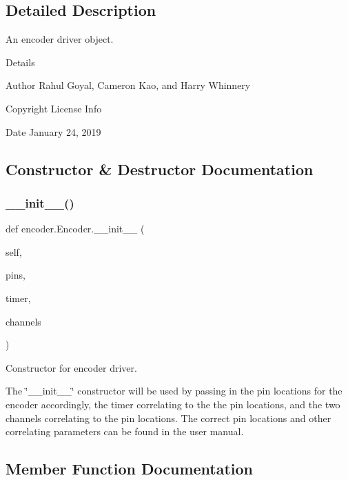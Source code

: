 \subsection{Detailed Description}
An encoder driver object. 

Details \begin{DoxyAuthor}{Author}
Rahul Goyal, Cameron Kao, and Harry Whinnery 
\end{DoxyAuthor}
\begin{DoxyCopyright}{Copyright}
License Info 
\end{DoxyCopyright}
\begin{DoxyDate}{Date}
January 24, 2019 
\end{DoxyDate}


\subsection{Constructor \& Destructor Documentation}
\mbox{\label{classencoder_1_1_encoder_a34939827412badc93f8744540676e833}} 
\subsubsection{\texorpdfstring{\+\_\+\+\_\+init\+\_\+\+\_\+()}{\_\_init\_\_()}}
{\footnotesize\ttfamily def encoder.\+Encoder.\+\_\+\+\_\+init\+\_\+\+\_\+ (\begin{DoxyParamCaption}\item[{}]{self,  }\item[{}]{pins,  }\item[{}]{timer,  }\item[{}]{channels }\end{DoxyParamCaption})}



Constructor for encoder driver. 

The \char`\"{}\+\_\+\+\_\+init\+\_\+\+\_\+\char`\"{} constructor will be used by passing in the pin locations for the encoder accordingly, the timer correlating to the the pin locations, and the two channels correlating to the pin locations. The correct pin locations and other correlating parameters can be found in the user manual. 

\subsection{Member Function Documentation}
\mbox{\label{classencoder_1_1_encoder_aa1c1535160682500f5214f45d8197027}} 
